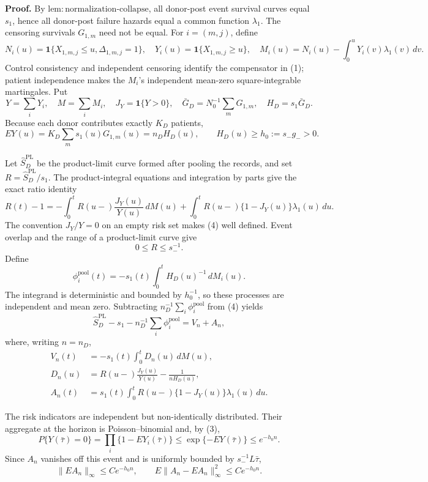 \textbf{Proof.}
By \(\mathrm{lem:normalization\mbox{-}collapse}\), all donor-post event
survival curves equal \(s_1\), hence all donor-post failure hazards equal a
common function \(\lambda_1\).  The censoring survivals \(G_{1,m}\) need
not be equal.  For \(i=(m,j)\), define
\[
 N_i(u)=\mathbf1\{X_{1,m,j}\le u,\Delta_{1,m,j}=1\},
 \quad Y_i(u)=\mathbf1\{X_{1,m,j}\ge u\},
 \quad M_i(u)=N_i(u)-\int_0^uY_i(v)\lambda_1(v)\,dv.       \tag{1}
\]
Control consistency and independent censoring identify the compensator in
(1); patient independence makes the \(M_i\)'s independent mean-zero
square-integrable martingales.  Put
\[
 Y=\sum_iY_i,
 \quad M=\sum_iM_i,
 \quad J_Y=\mathbf1\{Y>0\},
 \quad \bar G_D=N_0^{-1}\sum_mG_{1,m},
 \quad H_D=s_1\bar G_D.                                    \tag{2}
\]
Because each donor contributes exactly \(K_D\) patients,
\[
 EY(u)=K_D\sum_m s_1(u)G_{1,m}(u)=n_DH_D(u),
 \qquad H_D(u)\ge h_0:=s_-g_->0.                           \tag{3}
\]

Let \(\widehat S_D^{\mathrm{PL}}\) be the product-limit curve formed after
pooling the records, and set \(R=\widehat S_D^{\mathrm{PL}}/s_1\).  The
product-integral equations and integration by parts give the exact ratio
identity
\[
 R(t)-1=-\int_0^tR(u-)\frac{J_Y(u)}{Y(u)}\,dM(u)
 +\int_0^tR(u-)\{1-J_Y(u)\}\lambda_1(u)\,du.               \tag{4}
\]
The convention \(J_Y/Y=0\) on an empty risk set makes (4) well defined.
Event overlap and the range of a product-limit curve give
\[
 0\le R\le s_-^{-1}.                                       \tag{5}
\]
Define
\[
 \phi_i^{\mathrm{pool}}(t)
 =-s_1(t)\int_0^tH_D(u)^{-1}\,dM_i(u).                     \tag{6}
\]
The integrand is deterministic and bounded by \(h_0^{-1}\), so these
processes are independent and mean zero.  Subtracting
\(n_D^{-1}\sum_i\phi_i^{\mathrm{pool}}\) from (4) yields
\[
 \widehat S_D^{\mathrm{PL}}-s_1-n_D^{-1}\sum_i\phi_i^{\mathrm{pool}}
 =V_n+A_n,                                                   \tag{7}
\]
where, writing \(n=n_D\),
\[
 \begin{split}
 V_n(t)&=-s_1(t)\int_0^tD_n(u)\,dM(u),\\
 D_n(u)&=R(u-)\frac{J_Y(u)}{Y(u)}-\frac1{nH_D(u)},\\
 A_n(t)&=s_1(t)\int_0^tR(u-)\{1-J_Y(u)\}\lambda_1(u)\,du.
 \end{split}                                                \tag{8}
\]

The risk indicators are independent but non-identically distributed.
Their aggregate at the horizon is Poisson--binomial and, by (3),
\[
 P\{Y(\bar\tau)=0\}
 =\prod_i\{1-EY_i(\bar\tau)\}
 \le\exp\{-EY(\bar\tau)\}
 \le e^{-h_0n}.                                             \tag{9}
\]
Since \(A_n\) vanishes off this event and is uniformly bounded by
\(s_-^{-1}L\bar\tau\),
\[
 \|EA_n\|_\infty\le Ce^{-h_0n},
 \qquad E\|A_n-EA_n\|_\infty^2\le Ce^{-h_0n}.              \tag{10}
\]

